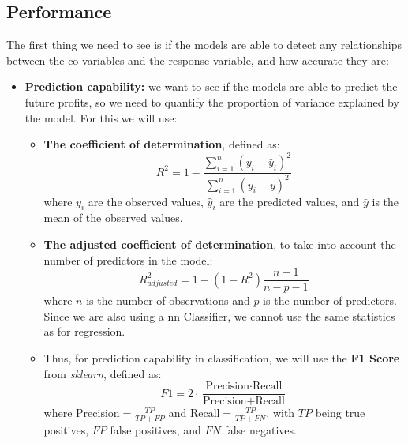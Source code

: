 \documentclass[11pt,english,a4paper,hidelinks]{book}
\begin{document}
\subsection{Performance}
The first thing we need to see is if the models are able to detect any relationships between the co-variables and the response variable, and how accurate they are:
\begin{itemize}
    \item \textbf{Prediction capability:} we want to see if the models are able to predict the future profits, so we need to quantify the proportion of variance explained by the model. For this we will use:
    \begin{itemize}
        \item  \textbf{The coefficient of determination}, defined as:
        \begin{equation}
            R^2 = 1 - \frac{\sum_{i=1}^{n} {(y_i - \hat{y}_i)}^2}{\sum_{i=1}^{n} {(y_i - \bar{y})}^2}
        \end{equation}
        where \(y_i\) are the observed values, \(\hat{y}_i\) are the predicted values, and \(\bar{y}\) is the mean of the observed values.
        \item \textbf{The adjusted coefficient of determination}, to take into account the number of predictors in the model:
        \begin{equation}
            R^2_{adjusted} = 1 - \left(1 - R^2\right) \frac{n - 1}{n - p - 1}
        \end{equation}
        where \(n\) is the number of observations and \(p\) is the number of predictors. Since we are also using a \acrshort{nn} Classifier, we cannot use the same statistics as for regression.
        \item Thus, for prediction capability in classification, we will use the \textbf{F1 Score} from \textit{sklearn}, defined as:
        \begin{equation}
            F1 = 2 \cdot \frac{\text{Precision} \cdot \text{Recall}}{\text{Precision} + \text{Recall}}
        \end{equation}
        where \(\text{Precision} = \frac{TP}{TP + FP}\) and \(\text{Recall} = \frac{TP}{TP + FN}\), with \(TP\) being true positives, \(FP\) false positives, and \(FN\) false negatives.


\end{itemize}
\end{itemize}
\end{document}
